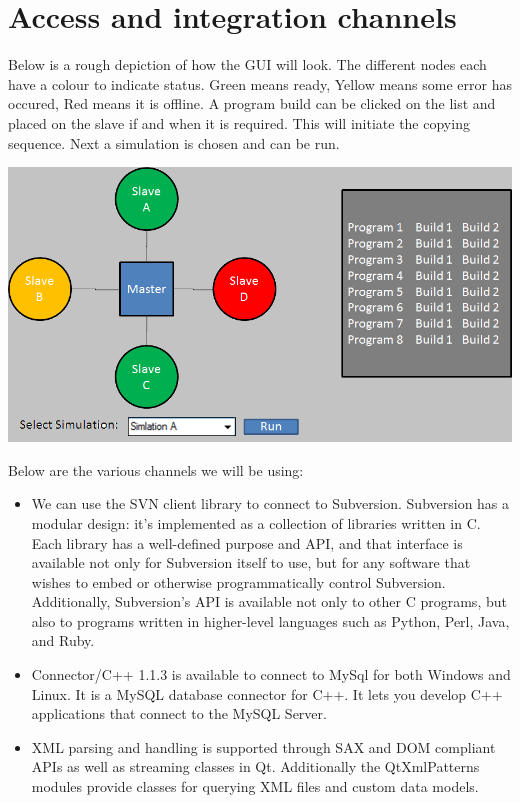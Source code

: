 \documentclass[a4paper,12pt,final]{article}
\begin{document}
\section{Access and integration channels}
Below is a rough depiction of how the GUI will look. The different nodes each have a colour to indicate status. Green means ready, Yellow means some error has occured, Red means it is offline. A program build can be clicked on the list and placed on the slave if and when it is required. This will initiate the copying sequence. Next a simulation is chosen and can be run.\\
\begin{center}
  	\includegraphics[scale=0.65]{GuiPlan.png} 
  \end{center}
Below are the various channels we will be using:
\begin{itemize}
\item We can use the SVN client library to connect to Subversion. Subversion has a modular design: it's implemented as a collection of libraries written in C. Each library has a well-defined purpose and API, and that interface is available not only for Subversion itself to use, but for any software that wishes to embed or otherwise programmatically control Subversion. Additionally, Subversion's API is available not only to other C programs, but also to programs written in higher-level languages such as Python, Perl, Java, and Ruby.
\item Connector/C++ 1.1.3 is available to connect to MySql for both Windows and Linux. It is a MySQL database connector for C++. It lets you develop C++ applications that connect to the MySQL Server.
\item XML parsing and handling is supported through SAX and DOM compliant APIs as well as streaming classes in Qt. Additionally the QtXmlPatterns modules provide classes for querying XML files and custom data models.
\end{itemize}
\end{document}
